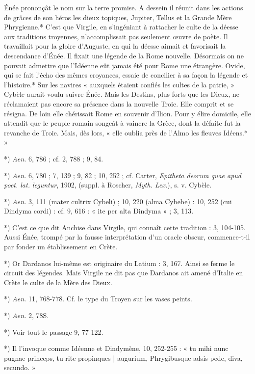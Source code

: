 \documentclass[a4paper, 11pt, oneside, polutonikogreek, french]{article}
\begin{document}
Énée prononçât le nom sur la terre promise. A dessein il réunit dans les actions de grâces de son héros les dieux topiques, Jupiter, Tellus et la Grande Mère Phrygienne.* C'est que Virgile, en s'ingéniant à rattacher le culte de la déesse aux traditions troyennes, n'accomplissait pas seulement œuvre de poète. Il travaillait pour la gloire d'Auguste, en qui la déesse aimait et favorisait la descendance d'Énée. Il fixait une légende de la Rome nouvelle. Désormais on ne pouvait admettre que l'Idéenne eût jamais été pour Rome une étrangère. Ovide, qui se fait l'écho des mêmes croyances, essaie de concilier à sa façon la légende et l'histoire.* Sur les navires « auxquels étaient confiés les cultes de la patrie, » Cybèle aurait voulu suivre Énée. Mais les Destins, plus forts que les Dieux, ne réclamaient pas encore sa présence dans la nouvelle Troie. Elle comprit et se résigna. De loin elle chérissait Rome en souvenir d'Ilion. Pour y élire domicile, elle attendit que le peuple romain songeât à vaincre la Grèce, dont la défaite fut la revanche de Troie. Mais, dès lors, « elle oublia près de l'Almo les fleuves Idéens.* »

*) \emph{Aen.} 6, 786 ; cf. 2, 788 ; 9, 84.

*) \emph{Aen.} 6, 780 ; 7, 139 ; 9, 82 ; 10, 252 ; cf. Carter, \emph{Epitheta deorum quae apud poet. lat. leguntur}, 1902, (suppl. à Roscher, \emph{Myth. Lex.}), s. v. Cybèle.

*) \emph{Aen.} 3, 111 (mater cultrix Cybeli) ; 10, 220 (alma Cybebe) : 10, 252 (cui Dindyma cordi) : cf. 9, 616 : « ite per alta Dindyma » ; 3, 113.

*) C'est ce que dit Anchise dans Virgile, qui connaît cette tradition : 3, 104-105. Aussi Énée, trompé par la fausse interprétation d'un oracle obscur, commence-t-il par fonder un établissement en Crète.

*) Or Dardanos lui-même est originaire du Latium : 3, 167. Ainsi se ferme le circuit des légendes. Mais Virgile ne dit pas que Dardanos ait amené d'Italie en Crète le culte de la Mère des Dieux.

*) \emph{Aen.} 11, 768-778. Cf. le type du Troyen sur les vases peints.

*) \emph{Aen.} 2, 78S.

*) Voir tout le passage 9, 77-122.

*) Il l'invoque comme Idéenne et Dindymène, 10, 252-255 : « tu mihi nunc pugnae princeps, tu rite propinques | augurium, Phrygibusque adsis pede, diva, secundo. »
\end{document}
